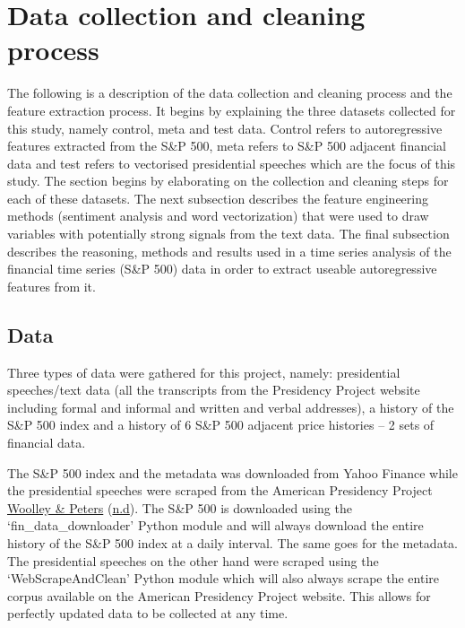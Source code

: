\documentclass[11pt,preprint, authoryear]{elsarticle}
\numberwithin{equation}{section}
\numberwithin{figure}{section}
\numberwithin{table}{section}
\begin{document}
\hypertarget{data-collection-and-cleaning-process}{%
\section{Data collection and cleaning
process}\label{data-collection-and-cleaning-process}}

The following is a description of the data collection and cleaning
process and the feature extraction process. It begins by explaining the
three datasets collected for this study, namely control, meta and test
data. Control refers to autoregressive features extracted from the S\&P
500, meta refers to S\&P 500 adjacent financial data and test refers to
vectorised presidential speeches which are the focus of this study. The
section begins by elaborating on the collection and cleaning steps for
each of these datasets. The next subsection describes the feature
engineering methods (sentiment analysis and word vectorization) that
were used to draw variables with potentially strong signals from the
text data. The final subsection describes the reasoning, methods and
results used in a time series analysis of the financial time series
(S\&P 500) data in order to extract useable autoregressive features from
it.

\hypertarget{data-1}{%
\subsection{Data}\label{data-1}}

Three types of data were gathered for this project, namely: presidential
speeches/text data (all the transcripts from the Presidency Project
website including formal and informal and written and verbal addresses),
a history of the S\&P 500 index and a history of 6 S\&P 500 adjacent
price histories -- 2 sets of financial data.

The S\&P 500 index and the metadata was downloaded from Yahoo Finance
while the presidential speeches were scraped from the American
Presidency Project \protect\hyperlink{ref-americanPresProj1}{Woolley \&
Peters} (\protect\hyperlink{ref-americanPresProj1}{n.d}). The S\&P 500
is downloaded using the `fin\_data\_downloader' Python module and will
always download the entire history of the S\&P 500 index at a daily
interval. The same goes for the metadata. The presidential speeches on
the other hand were scraped using the `WebScrapeAndClean' Python module
which will also always scrape the entire corpus available on the
American Presidency Project website. This allows for perfectly updated
data to be collected at any time.
\end{document}
